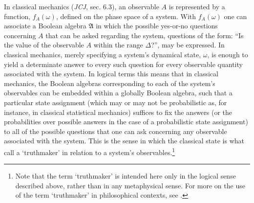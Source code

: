 \documentclass[12pt,english,twoside]{article}
\numberwithin{equation}{section}
\begin{document}
In classical mechanics (\emph{JCJ}, sec. 6.3), an observable $A$ is represented by a function, $f_A(\omega)$, defined on the phase space of a system. With $f_A(\omega)$ one can associate a Boolean algebra $\mathfrak{A}$ in which the possible yes-or-no questions concerning $A$ that can be asked regarding the system, questions of the form: ``Is the value of the observable $A$ within the range $\Delta$?'', may be expressed. In classical mechanics, merely specifying a system's dynamical state, $\omega$, is enough to yield a determinate answer to every such question for every observable quantity associated with the system. In logical terms this means that in classical mechanics, the Boolean algebras corresponding to each of the system's observables can be embedded within a globally Boolean algebra, such that a particular state assignment (which may or may not be probabilistic as, for instance, in classical statistical mechanics) suffices to fix the answers (or the probabilities over possible answers in the case of a probabilistic state assignment) to all of the possible questions that one can ask concerning any observable associated with the system. This is the sense in which the classical state is what \citet[][p. 433]{bub-pitowsky2010} call a `truthmaker' in relation to a system's observables.\footnote{Note that the term `truthmaker' is intended here only in the logical sense described above, rather than in any metaphysical sense. For more on the use of the term `truthmaker' in philosophical contexts, see \citet[]{macbrideTruthmakerSEP}.}
\end{document}
